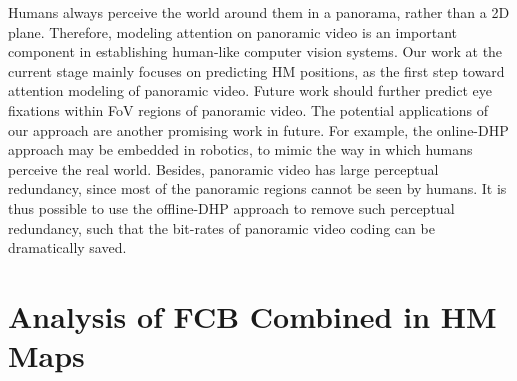 \documentclass[10pt,journal,compsoc]{IEEEtran}
\begin{document}
Humans always perceive the world around them in a panorama, rather than a 2D plane. Therefore, modeling attention on panoramic video is an important component in establishing human-like computer vision systems. Our work at the current stage mainly focuses on predicting HM positions, as the first step toward attention modeling of panoramic video. Future work should further predict eye fixations within FoV regions of panoramic video. The potential applications of our approach are another promising work in future. For example, the online-DHP approach may be embedded in robotics, to mimic the way in which humans perceive the real world. Besides, panoramic video has large perceptual redundancy, since most of the panoramic regions cannot be seen by humans. It is thus possible to use the offline-DHP approach to remove such perceptual redundancy, such that the bit-rates of panoramic video coding can be dramatically saved.






%


\appendices
\section{Analysis of FCB Combined in HM Maps}
\end{document}
